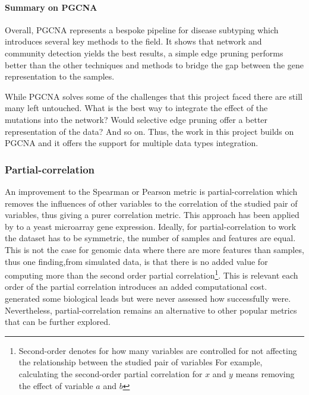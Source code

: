 \paragraph*{Summary on PGCNA}

Overall, PGCNA represents a bespoke pipeline for disease subtyping which introduces several key methods to the field. It shows that network and community detection yields the best results, a simple edge pruning performs better than the other techniques and methods to bridge the gap between the gene representation to the samples.

While PGCNA solves some of the challenges that this project faced there are still many left untouched. What is the best way to integrate the effect of the mutations into the network? Would selective edge pruning offer a better representation of the data? And so on. Thus, the work in this project builds on PGCNA and it offers the support for multiple data types integration.

\subsubsection{Partial-correlation} \label{s:lit:partial-corr}

An improvement to the Spearman or Pearson metric is partial-correlation which removes the influences of other variables to the correlation of the studied pair of variables, thus giving a purer correlation metric. This approach has been applied by \citet{De_la_Fuente2004-ts} to a yeast microarray gene expression. Ideally, for partial-correlation to work the dataset has to be symmetric, the number of samples and features are equal. This is not the case for genomic data where there are more features than samples, thus one finding,from simulated data, is that there is no added value for computing more than the second order partial correlation\footnote{Second-order denotes for how many variables are controlled for not affecting the relationship between the studied pair of variables For example, calculating the second-order partial correlation for $x$ and $y$ means removing the effect of variable $a$ and $b$}. This is relevant each order of the partial correlation introduces an added computational cost. \citet{De_la_Fuente2004-ts} generated some biological leads but were never assessed how successfully were. Nevertheless, partial-correlation remains an alternative to other popular metrics that can be further explored.

